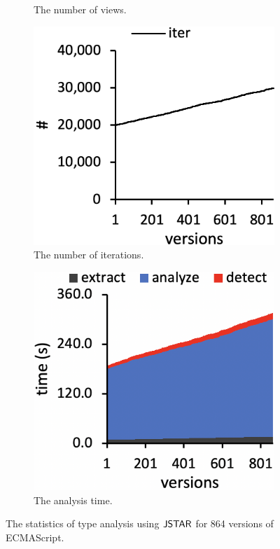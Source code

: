 \begin{figure}
\begin{subfigure}[b]{0.24\textwidth}
    \caption{The number of views.}
  \end{subfigure}
  \begin{subfigure}[b]{0.24\textwidth}
    \includegraphics[width=\textwidth]{img/iter}
    \caption{The number of iterations.}
  \end{subfigure}
  \begin{subfigure}[b]{0.24\textwidth}
    \includegraphics[width=\textwidth]{img/time}
    \caption{The analysis time.}
  \end{subfigure}
  \caption{The statistics of type analysis using $\tool$ for 864 versions of
  ECMAScript.}
  \vspace*{-1.5em}
  \label{fig:stat}
\end{figure}

